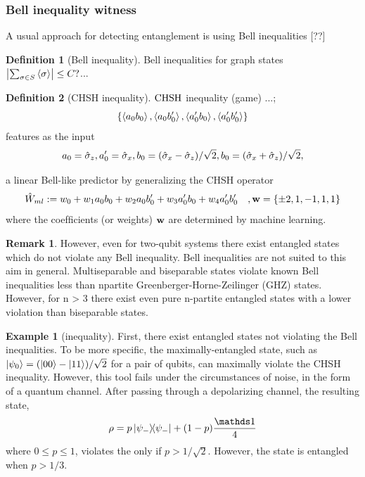 \documentclass[
10pt,
aps,
pra,
linenumbers,
floatfix,
]{revtex4-2}
\theoremstyle{plain}
\theoremstyle{definition}
\newtheorem{definition}{Definition}
\newtheorem{example}{Example}
\newtheorem{remark}{Remark}
\newcommand{\ew}{\hat{W}}
\newcommand{\chsh}{\textup{CHSH}}
\newcommand{\dm}{\rho}
\begin{document}
\subsubsection{Bell inequality witness}
A usual approach for detecting entanglement is using Bell inequalities [??]
\begin{definition}[Bell inequality]\label{def:bell_inequality}
	Bell inequalities for graph states $\abs{\sum_{\sigma\in S} \expval{\sigma}}\le C?$...
\end{definition}
\begin{definition}[CHSH inequality]\label{def:chsh_inequality}
	$\chsh$ inequality (game) ...; 
	\begin{equation}
		\qty{\expval{a_0 b_0}, \expval{a_0 b_0'}, \expval{a_0' b_0}, \expval{a_0' b_0'} }
	\end{equation}
	features as the input 
	\begin{equation}
		a_0 = \hat{\sigma}_z, a_0' = \hat{\sigma}_x, 
		b_0 = (\hat{\sigma}_x-\hat{\sigma}_z)/\sqrt{2},
		b_0 = (\hat{\sigma}_x+\hat{\sigma}_z)/\sqrt{2},
	\end{equation}
\end{definition}
a linear Bell-like predictor by generalizing the CHSH operator
\begin{equation}
	\ew_{ml} := w_0 + w_1 a_0 b_0 +  w_2 a_0 b_0' +  w_3 a_0' b_0 +  w_4 a_0' b_0'
	\quad, \vb{w} = \qty{\pm 2, 1, -1, 1, 1}
\end{equation}
where the coefﬁcients (or weights) $\vb{w}$ are determined by machine learning.
\begin{remark}
	However, even for two-qubit systems there exist entangled states which do not violate any Bell inequality.
	Bell inequalities are not suited to this aim in general. Multiseparable and biseparable states violate known Bell inequalities less than npartite Greenberger-Horne-Zeilinger (GHZ) states. However, for n > 3 there exist even pure n-partite entangled states with a lower violation than biseparable states. \cite{bourennaneWitnessingMultipartiteEntanglement2004}
\end{remark}
\begin{example}[inequality]
	\cite{maTransformingBellInequalities2018}
	First, there exist entangled states not violating the Bell inequalities. 
	To be more speciﬁc, the maximally-entangled state, such as $\ket{\psi_0} = ( \ket{00} - \ket{11} ) / \sqrt{2}$ for a pair of qubits, can maximally violate the CHSH inequality. 
	However, this tool fails under the circumstances of noise, in the form of a quantum channel. After passing through a depolarizing channel, the resulting state,	
	\begin{equation}
		\dm = p \op{\psi_-} + (1 - p) \frac{\identity}{4}
	\end{equation}
	where $0 \le p \le 1$, violates the  only if $p > 1/ \sqrt{2}$. However, the state is entangled when $p > 1/3$.
\end{example}
\end{document}
